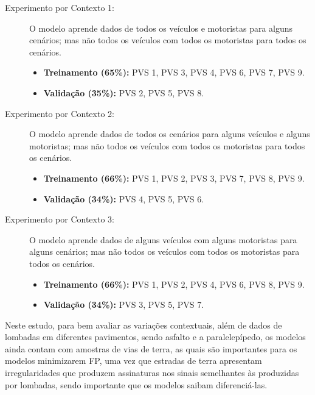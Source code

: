 \begin{description}
	
	\item[Experimento por Contexto 1:] O modelo aprende dados de todos os veículos e motoristas para alguns cenários; mas não todos os veículos com todos os motoristas para todos os cenários.
    \begin{itemize}
        \item \textbf{Treinamento (65\%):} PVS 1, PVS 3, PVS 4, PVS 6, PVS 7, PVS 9. 
        \item \textbf{Validação (35\%):} PVS 2, PVS 5, PVS 8.
    \end{itemize}
    
    \item[Experimento por Contexto 2:] O modelo aprende dados de todos os cenários para alguns veículos e alguns motoristas; mas não todos os veículos com todos os motoristas para todos os cenários.
    \begin{itemize}
        \item \textbf{Treinamento (66\%):} PVS 1, PVS 2, PVS 3, PVS 7, PVS 8, PVS 9.
        \item \textbf{Validação (34\%):} PVS 4, PVS 5, PVS 6.
    \end{itemize}
    
    \item[Experimento por Contexto 3:] O modelo aprende dados de alguns veículos com alguns motoristas para alguns cenários; mas não todos os veículos com todos os motoristas para todos os cenários.
    \begin{itemize}
        \item \textbf{Treinamento (66\%):} PVS 1, PVS 2, PVS 4, PVS 6, PVS 8, PVS 9.
        \item \textbf{Validação (34\%):} PVS 3, PVS 5, PVS 7.
    \end{itemize}
    
\end{description}

Neste estudo, para bem avaliar as variações contextuais, além de dados de lombadas em diferentes pavimentos, sendo asfalto e a paralelepípedo, os modelos ainda contam com amostras de vias de terra, as quais são importantes para os modelos minimizarem FP, uma vez que estradas de terra apresentam irregularidades que produzem assinaturas nos sinais semelhantes às produzidas por lombadas, sendo importante que os modelos saibam diferenciá-las. 

